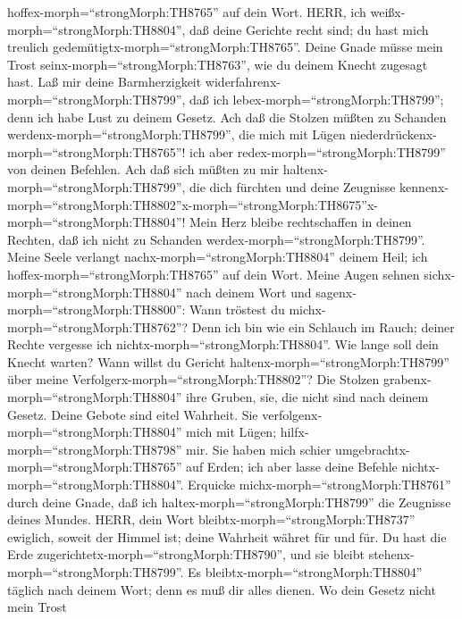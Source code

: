 hoffex-morph=``strongMorph:TH8765'' auf dein Wort.  HERR,
ich weißx-morph=``strongMorph:TH8804'', daß deine Gerichte recht sind;
du hast mich treulich gedemütigtx-morph=``strongMorph:TH8765''.
 Deine Gnade müsse mein Trost
seinx-morph=``strongMorph:TH8763'', wie du deinem Knecht zugesagt hast.
 Laß mir deine Barmherzigkeit
widerfahrenx-morph=``strongMorph:TH8799'', daß ich
lebex-morph=``strongMorph:TH8799''; denn ich habe Lust zu deinem Gesetz.
 Ach daß die Stolzen müßten zu Schanden
werdenx-morph=``strongMorph:TH8799'', die mich mit Lügen
niederdrückenx-morph=``strongMorph:TH8765''! ich aber
redex-morph=``strongMorph:TH8799'' von deinen Befehlen. 
Ach daß sich müßten zu mir haltenx-morph=``strongMorph:TH8799'', die
dich fürchten und deine Zeugnisse
kennenx-morph=``strongMorph:TH8802''\textbar x-morph=``strongMorph:TH8675''x-morph=``strongMorph:TH8804''!
 Mein Herz bleibe rechtschaffen in deinen Rechten, daß ich
nicht zu Schanden werdex-morph=``strongMorph:TH8799''. 
Meine Seele verlangt nachx-morph=``strongMorph:TH8804'' deinem Heil; ich
hoffex-morph=``strongMorph:TH8765'' auf dein Wort.  Meine
Augen sehnen sichx-morph=``strongMorph:TH8804'' nach deinem Wort und
sagenx-morph=``strongMorph:TH8800'': Wann tröstest du
michx-morph=``strongMorph:TH8762''?  Denn ich bin wie ein
Schlauch im Rauch; deiner Rechte vergesse ich
nichtx-morph=``strongMorph:TH8804''.  Wie lange soll dein
Knecht warten? Wann willst du Gericht
haltenx-morph=``strongMorph:TH8799'' über meine
Verfolgerx-morph=``strongMorph:TH8802''?  Die Stolzen
grabenx-morph=``strongMorph:TH8804'' ihre Gruben, sie, die nicht sind
nach deinem Gesetz.  Deine Gebote sind eitel Wahrheit. Sie
verfolgenx-morph=``strongMorph:TH8804'' mich mit Lügen;
hilfx-morph=``strongMorph:TH8798'' mir.  Sie haben mich
schier umgebrachtx-morph=``strongMorph:TH8765'' auf Erden; ich aber
lasse deine Befehle nichtx-morph=``strongMorph:TH8804''. 
Erquicke michx-morph=``strongMorph:TH8761'' durch deine Gnade, daß ich
haltex-morph=``strongMorph:TH8799'' die Zeugnisse deines Mundes.
 HERR, dein Wort bleibtx-morph=``strongMorph:TH8737''
ewiglich, soweit der Himmel ist;  deine Wahrheit währet für
und für. Du hast die Erde zugerichtetx-morph=``strongMorph:TH8790'', und
sie bleibt stehenx-morph=``strongMorph:TH8799''.  Es
bleibtx-morph=``strongMorph:TH8804'' täglich nach deinem Wort; denn es
muß dir alles dienen.  Wo dein Gesetz nicht mein Trost
